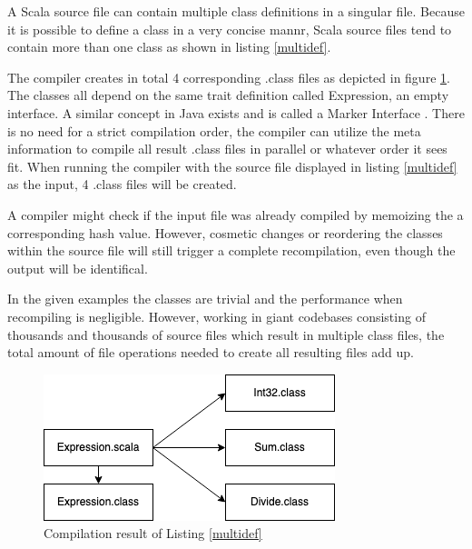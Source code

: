 \documentclass{VUMIFPSbakalaurinis}
\begin{document}

A Scala source file can contain multiple class definitions in a singular file.
Because it is possible to define a class in a very concise mannr, Scala source files tend to contain more than one class as shown in listing \ref{multidef}.




The compiler creates in total 4 corresponding .class files as depicted in figure \ref{img:Expression}.
The classes all depend on the same trait definition called Expression, an empty interface.
A similar concept in Java exists and is called a Marker Interface \cite{10.5555/1407381}.
There is no need for a strict compilation order, the compiler can utilize the meta information to compile all result .class files in parallel or whatever order it sees fit.
When running the compiler with the source file displayed in listing \ref{multidef} as the input, 4 .class files will be created.

A compiler might check if the input file was already compiled by memoizing the a corresponding hash value.
However, cosmetic changes or reordering the classes within the source file will still trigger a complete recompilation, even though the output will be identifical.

In the given examples the classes are trivial and the performance when recompiling is negligible.
However, working in giant codebases consisting of thousands and thousands of source files which result in multiple class files, the total amount of file operations needed to create all resulting files add up.

\begin{figure}[H]
    \centering
    \includegraphics[scale=0.6]{img/Expression}
    \caption{Compilation result of Listing \ref{multidef}}
    \label{img:Expression}
\end{figure}
\end{document}
